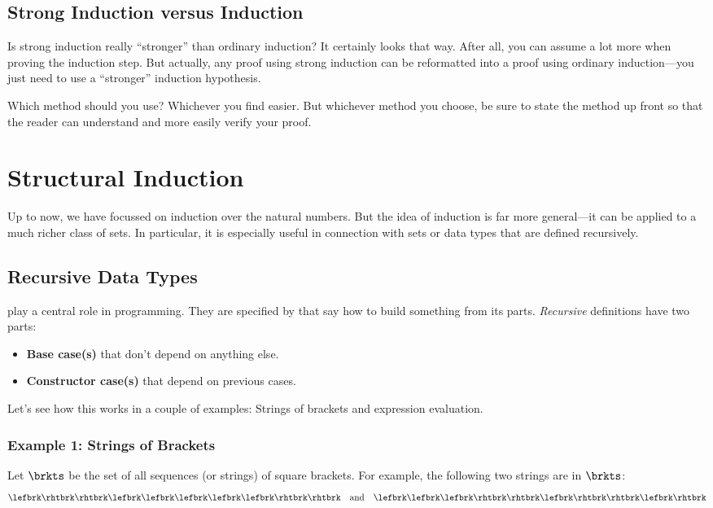 \subsection{Strong Induction versus Induction} 

Is strong induction really ``stronger'' than ordinary induction?  It
certainly looks that way.  After all, you can assume a lot more when
proving the induction step.  But actually, any proof using
strong induction can be reformatted into a proof using ordinary
induction---you
just need to use a ``stronger'' induction hypothesis.

Which method should you use?  Whichever you find easier.  But
whichever method you choose, be sure to state the method up front so
that the reader can understand and more easily verify your proof.

\section{Structural Induction}

Up to now, we have focussed on induction over the natural numbers.
But the idea of induction is far more general---it can be applied to a
much richer class of sets.  In particular, it is especially useful in
connection with sets or data types that are defined recursively.

\subsection{Recursive Data Types}

 play a central role in programming.  They
are specified by 
that say how to build something from its parts.  \emph{Recursive}
definitions have two parts:
\begin{itemize}
\item \textbf{Base case(s)} that don't depend on anything else.
\item \textbf{Constructor case(s)} that depend on previous cases.
\end{itemize}
Let's see how this works in a couple of examples: Strings of brackets
and expression evaluation.

\subsubsection{Example 1: Strings of Brackets}

Let $\brkts$ be the set of all sequences (or strings) of square
brackets.  For example,
the following two strings are in $\brkts$:
\begin{equation}\label{2strings}
\lefbrk\rhtbrk\rhtbrk\lefbrk\lefbrk\lefbrk\lefbrk\lefbrk\rhtbrk\rhtbrk\quad \text{and}\quad \lefbrk\lefbrk\lefbrk\rhtbrk\rhtbrk\lefbrk\rhtbrk\rhtbrk\lefbrk\rhtbrk
\end{equation}

